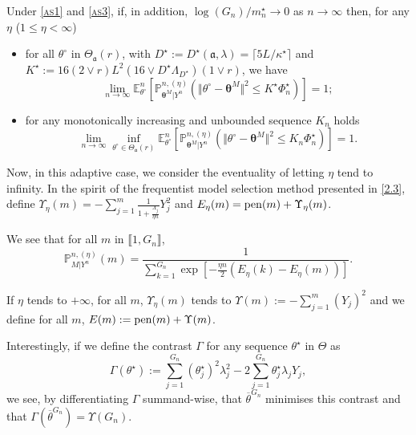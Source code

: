 \begin{cor}\label{cor4}
Under \textsc{\cref{as1}} and \textsc{\cref{as3}}, if, in addition, $\log(G_{n})/m_{n}^{\star} \rightarrow 0$ as $n \rightarrow \infty$ then, for any $\eta$ ($1 \leq \eta < \infty$)
\begin{itemize}
\item for all $\theta^{\circ}$ in $\Theta_{\mathfrak{a}}(r)$, with $D^{\star} := D^{\star}(\mathfrak{a}, \lambda) = \lceil 5 L/\kappa^{\star} \rceil$ and $K^{\star} := 16\left(2 \vee r\right)L^{2}\left(16 \vee D^{\star} \Lambda_{D^{\star}}\right)\left(1 \vee r \right)$, we have
\[\lim\limits_{n \rightarrow \infty} \mathds{E}_{\theta^{\circ}}^{n}\left[\mathds{P}_{\boldsymbol{\theta}^{M} \vert Y^{n}}^{n, (\eta)}\left(\Vert \theta^{\circ} - \boldsymbol{\theta}^{M} \Vert^{2} \leq K^{\star} \Phi_{n}^{\star}\right)\right] =1;\]
\item for any monotonically increasing and unbounded sequence $K_{n}$ holds
\[\lim\limits_{n \rightarrow \infty} \inf\limits_{\theta^{\circ} \in \Theta_{\mathfrak{a}}(r)} \mathds{E}_{\theta^{\circ}}^{n}\left[\mathds{P}_{\boldsymbol{\theta}^{M} \vert Y^{n}}^{n, (\eta)}\left(\Vert \theta^{\circ} - \boldsymbol{\theta}^{M} \Vert^{2} \leq K_{n} \Phi_{n}^{\star}\right)\right] =1.\]
\end{itemize}
\end{cor}


Now, in this adaptive case, we consider the eventuality of letting $\eta$ tend to infinity.
In the spirit of the frequentist model selection method presented in \textsc{\cref{2.3}}, define $\Upsilon_{\eta}(m) = - \sum\limits_{j = 1}^{m} \frac{1}{1 + \frac{\Lambda_{j}}{\eta n}} Y_{j}^{2}$ and $E_{\eta}(m) = \operatorname*{pen}(m) + \Upsilon_{\eta}(m)$.

We see that for all $m$ in $\llbracket 1, G_{n} \rrbracket$,
\[\mathds{P}_{M\vert Y^{n}}^{n, (\eta)}(m) = \frac{1}{\sum\limits_{k = 1}^{G_{n}}\exp\!\!\left[- \frac{\eta n}{2}\left(E_{\eta}(k) - E_{\eta}(m)\right)\right]}.\]

If $\eta$ tends to $+\infty$, for all $m$, $\Upsilon_{\eta}(m)$ tends to $\Upsilon(m) := -\sum\limits_{j = 1}^{m} \left(Y_{j}\right)^{2}$ and we define for all $m$, $E(m) := \operatorname*{pen}(m) + \Upsilon(m)$.

\medskip

Interestingly, if we define the contrast $\Gamma$ for any sequence $\theta^{\star}$ in $\Theta$ as
\[\Gamma\left(\theta^{\star}\right) := \sum\limits_{j = 1}^{G_{n}} \left(\theta^{\star}_{j}\right)^{2}\lambda_{j}^{2} - 2 \sum\limits_{j = 1}^{G_{n}} \theta^{\star}_{j}\lambda_{j} Y_{j},\]
we see, by differentiating $\Gamma$ summand-wise, that $\overline{\theta}^{G_{n}}$ minimises this contrast and that $\Gamma\left(\overline{\theta}^{G_{n}}\right) = \Upsilon\left(G_{n}\right)$.

